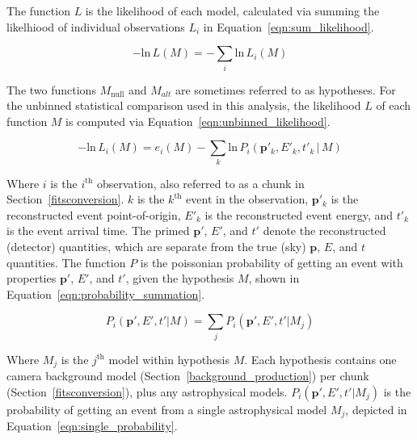   The function $L$ is the likelihood of each model, calculated via summing the likelhiood of individual observations $L_i$ in Equation~\ref{eqn:sum_likelihood}.
  
  \begin{equation}\label{eqn:sum_likelihood}
    - \text{ln} \, L \left(M \right ) = - \sum_i \text{ln} \, L_i \left(M \right )
  \end{equation}
  
  The two functions $M_{\text{null}}$ and $M_{alt}$ are sometimes referred to as hypotheses.
  For the unbinned statistical comparison used in this analysis, the likelihood $L$ of each function $M$ is computed via Equation~\ref{eqn:unbinned_likelihood}.
  
  \begin{equation}\label{eqn:unbinned_likelihood}
    - \text{ln} \, L_i \left ( M \right ) = e_i \left ( M \right ) - \sum_k \text{ln} \, P_i \left ( \boldsymbol{p}'_k, E'_k, t'_k \, | \, M \right )
  \end{equation}
  
  Where $i$ is the $i^{\text{th}}$ observation, also referred to as a chunk in Section~\ref{fitsconversion}.
  $k$ is the $k^{\text{th}}$ event in the observation, $\boldsymbol{p}'_k$ is the reconstructed event point-of-origin, $E'_k$ is the reconstructed event energy, and $t'_k$ is the event arrival time.
  The primed $\boldsymbol{p}'$, $E'$, and $t'$ denote the reconstructed (detector) quantities, which are separate from the true (sky) $\boldsymbol{p}$, $E$, and $t$ quantities.
  The function $P$ is the poissonian probability of getting an event with properties $\boldsymbol{p}'$, $E'$, and $t'$, given the hypothesis $M$, shown in Equation~\ref{eqn:probability_summation}.
  
  \begin{equation}\label{eqn:probability_summation}
  P_i \left ( \boldsymbol{p}', E', t' | M \right ) = \sum_j P_i \left ( \boldsymbol{p}', E', t' | M_j \right )
  \end{equation}

  Where $M_j$ is the $j^{\text{th}}$ model within hypothesis $M$.
  Each hypothesis contains one camera background model (Section~\ref{background_production}) per chunk (Section~\ref{fitsconversion}), plus any astrophysical models.
  $P_i \left( \boldsymbol{p}', E', t' | M_j \right )$ is the probability of getting an event from a single astrophysical model $M_j$, depicted in Equation~\ref{eqn:single_probability}.
  
